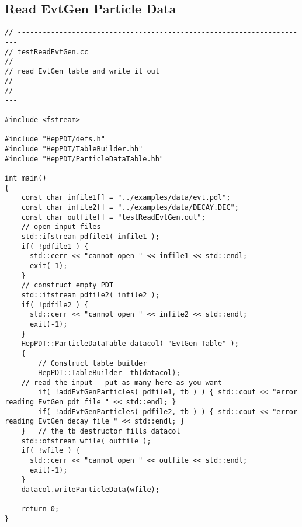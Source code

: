 \subsection { Read EvtGen Particle Data }
\begin{verbatim}
// ----------------------------------------------------------------------
// testReadEvtGen.cc
//
// read EvtGen table and write it out
//
// ----------------------------------------------------------------------

#include <fstream>

#include "HepPDT/defs.h"
#include "HepPDT/TableBuilder.hh"
#include "HepPDT/ParticleDataTable.hh"

int main()
{
    const char infile1[] = "../examples/data/evt.pdl";
    const char infile2[] = "../examples/data/DECAY.DEC";
    const char outfile[] = "testReadEvtGen.out";
    // open input files
    std::ifstream pdfile1( infile1 );
    if( !pdfile1 ) { 
      std::cerr << "cannot open " << infile1 << std::endl;
      exit(-1);
    }
    // construct empty PDT
    std::ifstream pdfile2( infile2 );
    if( !pdfile2 ) { 
      std::cerr << "cannot open " << infile2 << std::endl;
      exit(-1);
    }
    HepPDT::ParticleDataTable datacol( "EvtGen Table" );
    {
        // Construct table builder
        HepPDT::TableBuilder  tb(datacol);
	// read the input - put as many here as you want
        if( !addEvtGenParticles( pdfile1, tb ) ) { std::cout << "error reading EvtGen pdt file " << std::endl; }
        if( !addEvtGenParticles( pdfile2, tb ) ) { std::cout << "error reading EvtGen decay file " << std::endl; }
    }	// the tb destructor fills datacol
    std::ofstream wfile( outfile );
    if( !wfile ) { 
      std::cerr << "cannot open " << outfile << std::endl;
      exit(-1);
    }
    datacol.writeParticleData(wfile);
    
    return 0;
}
\end{verbatim}

